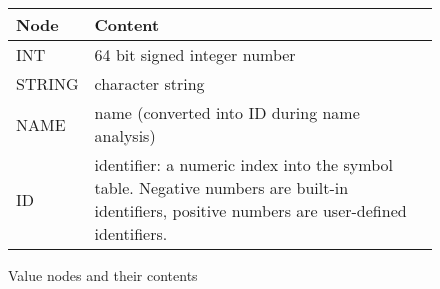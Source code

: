 \documentclass[11pt,a4paper]{article}
\begin{document}
\begin{figure}[h]
\begin{tabular}{|p{3cm}|p{14cm}|}
\hline
\textbf{Node} & \textbf{Content} \\
\hline
\hline
\textsf{INT} &  64 bit signed integer number\\
\hline
\textsf{STRING} & character string \\
\hline
\textsf{NAME  } & name (converted into \textsf{ID} during name analysis) \\
\hline
\textsf{ID    } & identifier: a numeric index into  the symbol table.  Negative numbers are built-in identifiers, positive numbers are user-defined identifiers.  \\
\hline
\end{tabular}
\caption{Value nodes and their contents}\label{fig:valnodes}
\end{figure}
\end{document}
